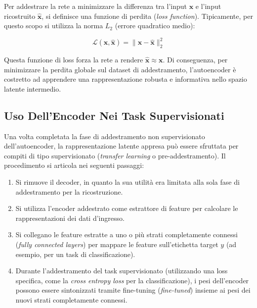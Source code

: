 ﻿\documentclass[11pt, a4paper]{article}
\begin{document}
Per addestrare la rete a minimizzare la differenza tra l'input $\bm{x}$ e l'input ricostruito $\bm{\hat{x}}$, si definisce una funzione di perdita (\emph{loss function}). Tipicamente, per questo scopo si utilizza la norma $L_2$ (errore quadratico medio):

\[
\mathcal{L}(\bm{x}, \bm{\hat{x}}) = \|\bm{x} - \bm{\hat{x}}\|_2^2
\]

Questa funzione di loss forza la rete a rendere $\bm{\hat{x}} \approx \bm{x}$. Di conseguenza, per minimizzare la perdita globale sul dataset di addestramento, l'autoencoder è costretto ad apprendere una rappresentazione robusta e informativa nello spazio latente intermedio.


\subsection{Uso Dell'Encoder Nei Task Supervisionati}

Una volta completata la fase di addestramento non supervisionato dell'autoencoder, la rappresentazione latente appresa può essere sfruttata per compiti di tipo supervisionato (\emph{transfer learning} o pre-addestramento). Il procedimento si articola nei seguenti passaggi:
\begin{enumerate}
    \item Si rimuove il decoder, in quanto la sua utilità era limitata alla sola fase di addestramento per la ricostruzione.
    \item Si utilizza l'encoder addestrato come estrattore di feature per calcolare le rappresentazioni dei dati d'ingresso.
    \item Si collegano le feature estratte a uno o più strati completamente connessi (\emph{fully connected layers}) per mappare le feature sull'etichetta target $y$ (ad esempio, per un task di classificazione).
    \item Durante l'addestramento del task supervisionato (utilizzando una loss specifica, come la \emph{cross entropy loss} per la classificazione), i pesi dell'encoder possono essere sintonizzati tramite fine-tuning (\emph{fine-tuned}) insieme ai pesi dei nuovi strati completamente connessi.
\end{enumerate}

\end{document}
